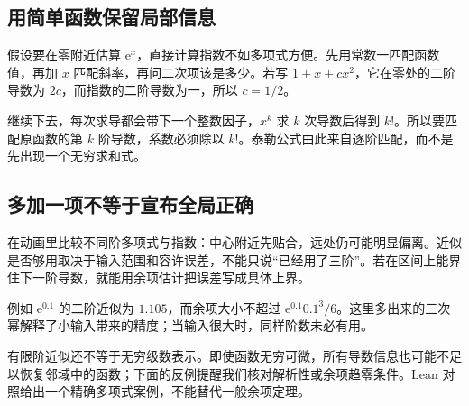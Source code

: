 \subsection*{用简单函数保留局部信息}
假设要在零附近估算 $\mathrm e^x$，直接计算指数不如多项式方便。先用常数一匹配函数值，再加 $x$ 匹配斜率，再问二次项该是多少。若写 $1+x+cx^2$，它在零处的二阶导数为 $2c$，而指数的二阶导数为一，所以 $c=1/2$。

继续下去，每次求导都会带下一个整数因子，$x^k$ 求 $k$ 次导数后得到 $k!$。所以要匹配原函数的第 $k$ 阶导数，系数必须除以 $k!$。泰勒公式由此来自逐阶匹配，而不是先出现一个无穷求和式。

\subsection*{多加一项不等于宣布全局正确}
在动画里比较不同阶多项式与指数：中心附近先贴合，远处仍可能明显偏离。近似是否够用取决于输入范围和容许误差，不能只说“已经用了三阶”。若在区间上能界住下一阶导数，就能用余项估计把误差写成具体上界。

例如 $\mathrm e^{0.1}$ 的二阶近似为 $1.105$，而余项大小不超过 $\mathrm e^{0.1}0.1^3/6$。这里多出来的三次幂解释了小输入带来的精度；当输入很大时，同样阶数未必有用。

有限阶近似还不等于无穷级数表示。即使函数无穷可微，所有导数信息也可能不足以恢复邻域中的函数；下面的反例提醒我们核对解析性或余项趋零条件。Lean 对照给出一个精确多项式案例，不能替代一般余项定理。
